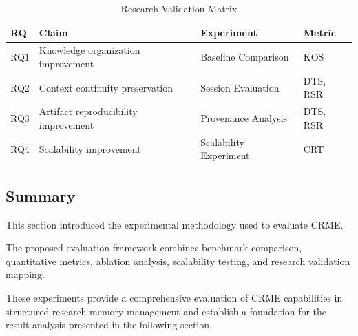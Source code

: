 \begin{table}[h]
\centering
\caption{Research Validation Matrix}
\label{tab:validation_matrix}

\begin{tabular}{p{2cm}p{3cm}p{3cm}p{2cm}}

\hline

RQ & Claim & Experiment & Metric\\

\hline

RQ1 & Knowledge organization improvement & Baseline Comparison & KOS\\

RQ2 & Context continuity preservation & Session Evaluation & DTS, RSR\\

RQ3 & Artifact reproducibility improvement & Provenance Analysis & DTS, RSR\\

RQ4 & Scalability improvement & Scalability Experiment & CRT\\

\hline

\end{tabular}

\end{table}



\subsection{Summary}

This section introduced the experimental methodology used to evaluate CRME.

The proposed evaluation framework combines benchmark comparison, quantitative metrics, ablation analysis, scalability testing, and research validation mapping.

These experiments provide a comprehensive evaluation of CRME capabilities in structured research memory management and establish a foundation for the result analysis presented in the following section.

